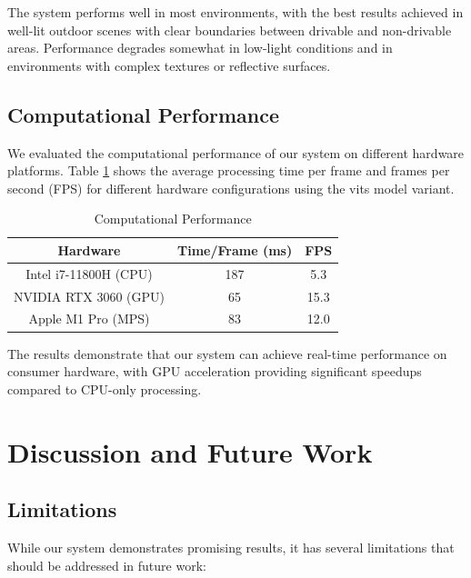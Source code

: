 \documentclass[conference]{IEEEtran}
\begin{document}
The system performs well in most environments, with the best results achieved in well-lit outdoor scenes with clear boundaries between drivable and non-drivable areas. Performance degrades somewhat in low-light conditions and in environments with complex textures or reflective surfaces.

\subsection{Computational Performance}
We evaluated the computational performance of our system on different hardware platforms. Table \ref{tab_performance} shows the average processing time per frame and frames per second (FPS) for different hardware configurations using the vits model variant.

\begin{table}[htbp]
\caption{Computational Performance}
\begin{center}
\begin{tabular}{|c|c|c|}
\hline
\textbf{Hardware} & \textbf{Time/Frame (ms)} & \textbf{FPS} \\
\hline
Intel i7-11800H (CPU) & 187 & 5.3 \\
\hline
NVIDIA RTX 3060 (GPU) & 65 & 15.3 \\
\hline
Apple M1 Pro (MPS) & 83 & 12.0 \\
\hline
\end{tabular}
\label{tab_performance}
\end{center}
\end{table}

The results demonstrate that our system can achieve real-time performance on consumer hardware, with GPU acceleration providing significant speedups compared to CPU-only processing.

\section{Discussion and Future Work}

\subsection{Limitations}
While our system demonstrates promising results, it has several limitations that should be addressed in future work:
\end{document}
